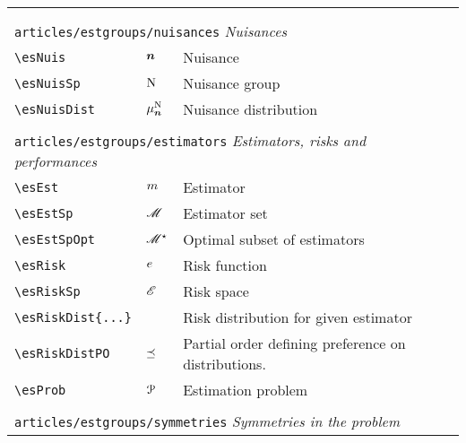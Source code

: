 \begin{longtable}{lll}
{\fbox{%
\color[rgb]{0.5,0.5,0.5}\begin{minipage}[]{8cm}%
$\esObs = \esNuis \esObsMap(\esSt)$\par%
{\small{\texttt{\$\textbackslash esObs = \textbackslash esNuis \textbackslash esObsMap(\textbackslash esSt)\$}}}\end{minipage}%
}%
}%
\\ 
  &  & \\ 
 \multicolumn{3}{l}{{\color[rgb]{0.5,0.5,0.5}\texttt{articles/estgroups/nuisances}} \emph{Nuisances}}\\ 
 \hline
{\color[rgb]{0.5,0.5,0.5}\texttt{\textbackslash esNuis}} & $\boldsymbol{n}$ &  Nuisance\\ 
 {\color[rgb]{0.5,0.5,0.5}\texttt{\textbackslash esNuisSp}} & $\mathrm{N}$ &  Nuisance group\\ 
 {\color[rgb]{0.5,0.5,0.5}\texttt{\textbackslash esNuisDist}} & $\mu^{\mathrm{N}}_{\boldsymbol{n}}$ &  Nuisance distribution\\ 
  &  & \\ 
 \multicolumn{3}{l}{{\color[rgb]{0.5,0.5,0.5}\texttt{articles/estgroups/estimators}} \emph{Estimators, risks and performances}}\\ 
 \hline
{\color[rgb]{0.5,0.5,0.5}\texttt{\textbackslash esEst}} & $m$ &  Estimator\\ 
 {\color[rgb]{0.5,0.5,0.5}\texttt{\textbackslash esEstSp}} & $\mathscr{M}$ &  Estimator set\\ 
 {\color[rgb]{0.5,0.5,0.5}\texttt{\textbackslash esEstSpOpt}} & $\mathscr{M}^\star$ &  Optimal subset of estimators\\ 
 {\color[rgb]{0.5,0.5,0.5}\texttt{\textbackslash esRisk}} & $e$ &  Risk function\\ 
 {\color[rgb]{0.5,0.5,0.5}\texttt{\textbackslash esRiskSp}} & $\mathscr{E}$ &  Risk space\\ 
 {\color[rgb]{0.5,0.5,0.5}\texttt{\textbackslash esRiskDist\{...\}}} &  &  Risk distribution for given estimator\\ 
 {\color[rgb]{0.5,0.5,0.5}\texttt{\textbackslash esRiskDistPO}} & $\preceq$ &  Partial order defining preference on distributions.\\ 
 {\color[rgb]{0.5,0.5,0.5}\texttt{\textbackslash esProb}} & $\mathcal{P}$ &  Estimation problem\\ 
  &  & \\ 
 \multicolumn{3}{l}{{\color[rgb]{0.5,0.5,0.5}\texttt{articles/estgroups/symmetries}} \emph{Symmetries in the problem}}\\ 

\end{longtable}

